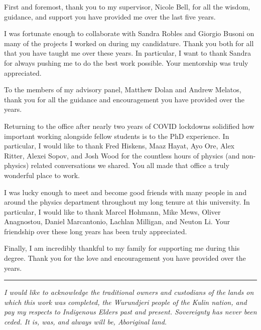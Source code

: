 \begin{acknowledgements}

  First and foremost, thank you to my supervisor, Nicole Bell, for all the wisdom, guidance, and support you have provided me over the last five years. 

  I was fortunate enough to collaborate with Sandra Robles and Giorgio Busoni on many of the projects I worked on during my candidature. Thank you both for all that you have taught me over these years. In particular, I want to thank Sandra for always pushing me to do the best work possible. Your mentorship was truly appreciated.

  To the members of my advisory panel, Matthew Dolan and Andrew Melatos, thank you for all the guidance and encouragement you have provided over the years.

  Returning to the office after nearly two years of COVID lockdowns solidified how important working alongside fellow students is to the PhD experience. In particular, I would like to thank Fred Hiskens, Maaz Hayat, Ayo Ore, Alex Ritter, Alexei Sopov, and Josh Wood for the countless hours of physics (and non-physics) related conversations we shared. You all made that office a truly wonderful place to work.
 
  I was lucky enough to meet and become good friends with many people in and around the physics department throughout my long tenure at this university. In particular, I would like to thank Marcel Hohmann, Mike Mews, Oliver Anagnostou, Daniel Marcantonio, Lachlan Milligan, and Neuton Li. Your friendship over these long years has been truly appreciated.

  Finally, I am incredibly thankful to my family for supporting me during this degree. Thank you for the love and encouragement you have provided over the years. 

  \vfill
  \noindent\rule{\textwidth}{0.5pt}
  \textit{I would like to acknowledge the traditional owners and custodians of the lands on which this work was completed, the Wurundjeri people of the Kulin nation, and pay my respects to Indigenous Elders past and present. Sovereignty has never been ceded. It is, was, and always will be, Aboriginal land.}
\end{acknowledgements}
